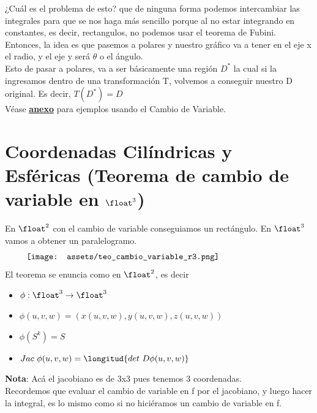 \documentclass[10pt,a4paper]{article}
\begin{document}
¿Cuál es el problema de esto? que de ninguna forma podemos intercambiar las integrales para que se nos haga más sencillo porque al no estar integrando en constantes, es decir, rectangulos, no podemos usar el teorema de Fubini. \\
Entonces, la idea es que pasemos a polares y nuestro gráfico va a tener en el eje x el radio, y el eje y será $\theta$ o el ángulo. \\
Esto de pasar a polares, va a ser básicamente una región $D^{*}$ la cual si la ingresamos dentro de una transformación T, volvemos a conseguir nuestro D original. Es decir, $T(D^{*}) = D$ \\
Véase \hyperref[subsec:cambio_variable]{\textbf{\underline{anexo}}} para ejemplos usando el Cambio de Variable.
\section*{Coordenadas Cilíndricas y Esféricas (Teorema de cambio de variable en $\float^{3}$)}
En $\float^{2}$ con el cambio de variable conseguiamos un rectángulo. En $\float^{3}$ vamos a obtener un paralelogramo. 
\[\begin{minipage}[b]{0.9\textwidth}
    \texttt{[image: assets/teo\_cambio\_variable\_r3.png]}
\end{minipage}\]
El teorema se enuncia como en $\float^{2}$, es decir 
\begin{itemize}
    \item $\phi:\float^{3} \rightarrow \float^{3}$
    \item $\phi(u,v,w) = (x(u, v, w), y(u, v, w), z(u, v, w))$
    \item $\phi(S^{k}) = S$
    \item $Jac \ \phi(u, v, w) = \longitud{det \ D \phi (u, v, w)}$
\end{itemize}
\textbf{Nota}: Acá el jacobiano es de 3x3 pues tenemos 3 coordenadas. \\
Recordemos que evaluar el cambio de variable en f por el jacobiano, y luego hacer la integral, es lo mismo como si no hiciéramos un cambio de variable en f.
\end{document}
